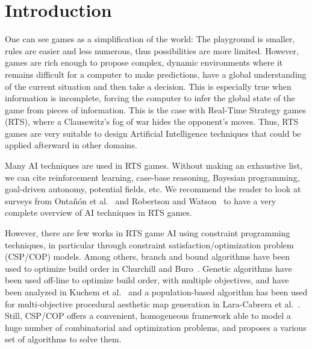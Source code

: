 \documentclass{article}
\newcommand{\csp}{\textsc{CSP}\xspace}
\newcommand{\cop}{\textsc{COP}\xspace}
\begin{document}
%

\maketitle

\section{Introduction}\label{sec:intro}

One can see games  as a simplification of the world:
The playground  is smaller, rules  are easier and less  numerous, thus
possibilities  are more  limited. However,  games are  rich enough  to
propose complex, dynamic environments where it remains difficult for a
computer  to make  predictions,  have a  global  understanding of  the
current situation  and then take  a decision. This is  especially true
when  information is  incomplete, forcing  the computer  to infer  the
global state of the game from  pieces of information. This is the case
with Real-Time Strategy  games (RTS), where a Clausewitz's  fog of war
hides  the opponent's  moves.  Thus,  RTS games  are very  suitable to
design  Artificial  Intelligence  techniques  that  could  be  applied
afterward in other domains.

Many AI techniques are used in RTS games. Without making an exhaustive
list,  we  can  cite   reinforcement  learning,  case-base  reasoning,
Bayesian programming, goal-driven autonomy,  potential fields, etc. We
recommend  the  reader to  look  at  surveys from  Onta{\~n}{\'o}n  et
al.~\cite{OntanonSURCM13} and Robertson and Watson~\cite{RobertsonW14}
to have a very complete overview of AI techniques in RTS games.

However,  there  are  few  works  in  RTS  game  AI  using  constraint
programming    techniques,    in   particular    through    constraint
satisfaction/optimization problem  (\csp/\cop) models.   Among others,
branch and bound algorithms have been  used to optimize build order in
Churchill and Buro~\cite{ChurchillB11}.   Genetic algorithms have been
used off-line to  optimize build order, with  multiple objectives, and
have  been   analyzed  in   Kuchem  et  al.~\cite{KuchemPR13}   and  a
population-based   algorithm  has   been   used  for   multi-objective
procedural    aesthetic   map    generation    in   Lara-Cabrera    et
al.~\cite{LaraCF14}.    Still,   \csp/\cop    offers   a   convenient,
homogeneous framework able to model a huge number of combinatorial and
optimization problems,  and proposes  a various  set of  algorithms to
solve them.
\end{document}
